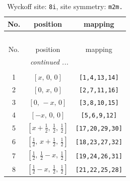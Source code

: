 \documentclass[fleqn,8pt]{jsarticle}
\begin{document}
\begin{longtable}{ccc}
\caption{Wyckoff site: {\tt 8i}, site symmetry: {\tt m2m.}}
 \\
 \hline \hline
No. & position & mapping \\ \hline \endfirsthead

\multicolumn{2}{l}{\tablename\ \thetable{}} \\
 \hline \hline
No. & position & mapping \\ \hline \endhead

 \hline \hline
\multicolumn{2}{r}{\footnotesize\it continued ...} \\ \endfoot

 \hline \hline
\multicolumn{2}{r}{} \\ \endlastfoot

1 & $\left[ x,\, 0,\, 0 \right]$ & {\tt [1,4,13,14]} \\ \hline
2 & $\left[ 0,\, x,\, 0 \right]$ & {\tt [2,7,11,16]} \\ \hline
3 & $\left[ 0,\, - x,\, 0 \right]$ & {\tt [3,8,10,15]} \\ \hline
4 & $\left[ - x,\, 0,\, 0 \right]$ & {\tt [5,6,9,12]} \\ \hline
5 & $\left[ x + \frac{1}{2},\, \frac{1}{2},\, \frac{1}{2} \right]$ & {\tt [17,20,29,30]} \\ \hline
6 & $\left[ \frac{1}{2},\, x + \frac{1}{2},\, \frac{1}{2} \right]$ & {\tt [18,23,27,32]} \\ \hline
7 & $\left[ \frac{1}{2},\, \frac{1}{2} - x,\, \frac{1}{2} \right]$ & {\tt [19,24,26,31]} \\ \hline
8 & $\left[ \frac{1}{2} - x,\, \frac{1}{2},\, \frac{1}{2} \right]$ & {\tt [21,22,25,28]} \\
\end{longtable}
\renewcommand{\arraystretch}{1.2}
\end{document}
